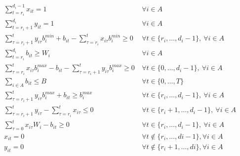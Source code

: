 \documentclass{report}
\newcommand{\bmin}{b_i^{min}}
\newcommand{\bmax}{b_i^{max}}
\begin{document}
\begin{eqnarray}
\sum_{t=r_i}^{d_i-1} x_{it} = 1 & \ \forall i \in A\\
\sum_{t=r_i+1}^{d_i} y_{it} = 1 & \ \forall i \in A\\
\sum_{\tau=r_i+1}^{t} y_{i\tau}\bmin + b_{it} - \sum_{\tau=r_i}^{t} x_{i\tau}\bmin \ge 0 & \ \forall t \in \{r_i,\dots,d_i-1\},\ \forall i \in A\\
\sum_{t=r_i}^{d_i} b_{it} \ge W_i & \ \forall i \in A\\
\sum_{\tau=r_i}^{t} x_{i\tau}\bmax - b_{it} - \sum_{\tau=r_i+1}^{t} y_{i\tau}\bmax \ge 0 & \ \forall t \in \{0,\dots,d_i-1\},\ \forall i \in A\\
\sum_{i \in A} b_{it} \le B & \ \forall t \in \{0,\dots,T\}\\
\sum_{\tau=r_i+1}^{t} y_{i\tau}\bmax + b_{it}\ge \bmax & \ \forall t \in \{r_i,\dots,d_i-1\},\ \forall i \in A\\
\sum_{\tau=r_i+1}^{t} y_{i\tau} - \sum_{\tau=r_i}^{t} x_{i\tau} \le 0 & \ \forall t \in \{r_i+1,\dots,d_i-1\},\ \forall i \in A\\
\sum_{\tau=0}^{t} x_{i\tau}W_i - b_{it}\ge 0 & \ \forall t \in \{r_i,\dots,d_i-1\},\ \forall i \in A\\
x_{it} = 0 & \ \forall t \not\in \{r_i,\dots,di-1\}, \forall i \in A\\
y_{it} = 0 & \ \forall t \not\in \{r_i+1,\dots,di\}, \forall i \in A
\end{eqnarray}
\end{document}
